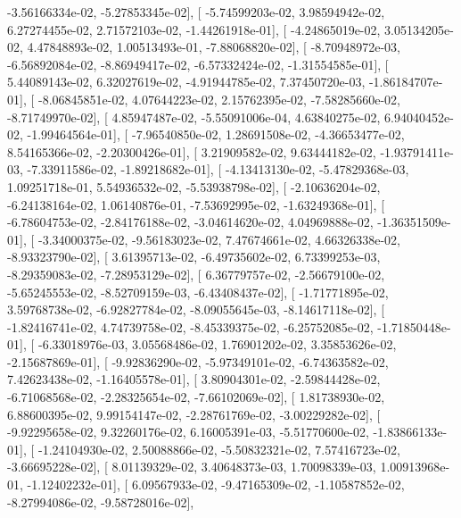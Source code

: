 \documentclass{article}
\begin{document}
         -3.56166334e-02,  -5.27853345e-02],
       [ -5.74599203e-02,   3.98594942e-02,   6.27274455e-02,
          2.71572103e-02,  -1.44261918e-01],
       [ -4.24865019e-02,   3.05134205e-02,   4.47848893e-02,
          1.00513493e-01,  -7.88068820e-02],
       [ -8.70948972e-03,  -6.56892084e-02,  -8.86949417e-02,
         -6.57332424e-02,  -1.31554585e-01],
       [  5.44089143e-02,   6.32027619e-02,  -4.91944785e-02,
          7.37450720e-03,  -1.86184707e-01],
       [ -8.06845851e-02,   4.07644223e-02,   2.15762395e-02,
         -7.58285660e-02,  -8.71749970e-02],
       [  4.85947487e-02,  -5.55091006e-04,   4.63840275e-02,
          6.94040452e-02,  -1.99464564e-01],
       [ -7.96540850e-02,   1.28691508e-02,  -4.36653477e-02,
          8.54165366e-02,  -2.20300426e-01],
       [  3.21909582e-02,   9.63444182e-02,  -1.93791411e-03,
         -7.33911586e-02,  -1.89218682e-01],
       [ -4.13413130e-02,  -5.47829368e-03,   1.09251718e-01,
          5.54936532e-02,  -5.53938798e-02],
       [ -2.10636204e-02,  -6.24138164e-02,   1.06140876e-01,
         -7.53692995e-02,  -1.63249368e-01],
       [ -6.78604753e-02,  -2.84176188e-02,  -3.04614620e-02,
          4.04969888e-02,  -1.36351509e-01],
       [ -3.34000375e-02,  -9.56183023e-02,   7.47674661e-02,
          4.66326338e-02,  -8.93323790e-02],
       [  3.61395713e-02,  -6.49735602e-02,   6.73399253e-03,
         -8.29359083e-02,  -7.28953129e-02],
       [  6.36779757e-02,  -2.56679100e-02,  -5.65245553e-02,
         -8.52709159e-03,  -6.43408437e-02],
       [ -1.71771895e-02,   3.59768738e-02,  -6.92827784e-02,
         -8.09055645e-03,  -8.14617118e-02],
       [ -1.82416741e-02,   4.74739758e-02,  -8.45339375e-02,
         -6.25752085e-02,  -1.71850448e-01],
       [ -6.33018976e-03,   3.05568486e-02,   1.76901202e-02,
          3.35853626e-02,  -2.15687869e-01],
       [ -9.92836290e-02,  -5.97349101e-02,  -6.74363582e-02,
          7.42623438e-02,  -1.16405578e-01],
       [  3.80904301e-02,  -2.59844428e-02,  -6.71068568e-02,
         -2.28325654e-02,  -7.66102069e-02],
       [  1.81738930e-02,   6.88600395e-02,   9.99154147e-02,
         -2.28761769e-02,  -3.00229282e-02],
       [ -9.92295658e-02,   9.32260176e-02,   6.16005391e-03,
         -5.51770600e-02,  -1.83866133e-01],
       [ -1.24104930e-02,   2.50088866e-02,  -5.50832321e-02,
          7.57416723e-02,  -3.66695228e-02],
       [  8.01139329e-02,   3.40648373e-03,   1.70098339e-03,
          1.00913968e-01,  -1.12402232e-01],
       [  6.09567933e-02,  -9.47165309e-02,  -1.10587852e-02,
         -8.27994086e-02,  -9.58728016e-02],
\end{document}
